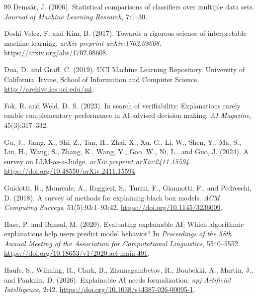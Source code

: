 \documentclass[twoside,11pt]{article}
\begin{document}
\begin{thebibliography}{99}
Dems\v{a}r, J. (2006).
Statistical comparisons of classifiers over multiple data sets.
\emph{Journal of Machine Learning Research}, 7:1--30.

Doshi-Velez, F. and Kim, B. (2017).
Towards a rigorous science of interpretable machine learning.
\emph{arXiv preprint arXiv:1702.08608}.
\url{https://arxiv.org/abs/1702.08608}.

Dua, D. and Graff, C. (2019).
{UCI} Machine Learning Repository.
University of California, Irvine, School of Information and Computer Science.
\url{http://archive.ics.uci.edu/ml}.

Fok, R. and Weld, D.~S. (2023).
In search of verifiability: Explanations rarely enable complementary
performance in AI-advised decision making.
\emph{AI Magazine}, 45(3):317--332.

Gu, J., Jiang, X., Shi, Z., Tan, H., Zhai, X., Xu, C., Li, W., Shen, Y.,
Ma, S., Liu, H., Wang, S., Zhang, K., Wang, Y., Gao, W., Ni, L., and
Guo, J. (2024).
A survey on LLM-as-a-Judge.
\emph{arXiv preprint arXiv:2411.15594}.
\url{https://doi.org/10.48550/arXiv.2411.15594}.

Guidotti, R., Monreale, A., Ruggieri, S., Turini, F., Giannotti, F.,
and Pedreschi, D. (2018).
A survey of methods for explaining black box models.
\emph{ACM Computing Surveys}, 51(5):93:1--93:42.
\url{https://doi.org/10.1145/3236009}.

Hase, P. and Bansal, M. (2020).
Evaluating explainable {AI}: Which algorithmic explanations help users
predict model behavior?
In \emph{Proceedings of the 58th Annual Meeting of the Association for
Computational Linguistics}, 5540--5552.
\url{https://doi.org/10.18653/v1/2020.acl-main.491}.

Haufe, S., Wilming, R., Clark, B., Zhumagambetov, R., Boubekki, A.,
Martin, J., and Panknin, D. (2026).
Explainable {AI} needs formalization.
\emph{npj Artificial Intelligence}, 2:42.
\url{https://doi.org/10.1038/s44387-026-00095-1}.


\end{thebibliography}
\end{document}
